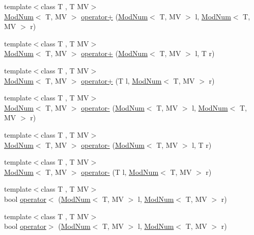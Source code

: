 \begin{DoxyCompactItemize}
\item 
{\footnotesize template$<$class T , T MV$>$ }\\\hyperlink{classModNum}{ModNum}$<$ T, MV $>$ \hyperlink{mod__num_8hh_af52718572c33bb045de69e9f52117615}{operator+} (\hyperlink{classModNum}{ModNum}$<$ T, MV $>$ l, \hyperlink{classModNum}{ModNum}$<$ T, MV $>$ r)
\item 
{\footnotesize template$<$class T , T MV$>$ }\\\hyperlink{classModNum}{ModNum}$<$ T, MV $>$ \hyperlink{mod__num_8hh_aaf99447ed554e609c6fc4dc36d138df0}{operator+} (\hyperlink{classModNum}{ModNum}$<$ T, MV $>$ l, T r)
\item 
{\footnotesize template$<$class T , T MV$>$ }\\\hyperlink{classModNum}{ModNum}$<$ T, MV $>$ \hyperlink{mod__num_8hh_af9edd9c0f5eb44a3e1e19c7a7dec606e}{operator+} (T l, \hyperlink{classModNum}{ModNum}$<$ T, MV $>$ r)
\item 
{\footnotesize template$<$class T , T MV$>$ }\\\hyperlink{classModNum}{ModNum}$<$ T, MV $>$ \hyperlink{mod__num_8hh_a0b84d236bd1e102c5583f610f6582935}{operator-\/} (\hyperlink{classModNum}{ModNum}$<$ T, MV $>$ l, \hyperlink{classModNum}{ModNum}$<$ T, MV $>$ r)
\item 
{\footnotesize template$<$class T , T MV$>$ }\\\hyperlink{classModNum}{ModNum}$<$ T, MV $>$ \hyperlink{mod__num_8hh_a94349bded8b1cad325abd3c73ad41b88}{operator-\/} (\hyperlink{classModNum}{ModNum}$<$ T, MV $>$ l, T r)
\item 
{\footnotesize template$<$class T , T MV$>$ }\\\hyperlink{classModNum}{ModNum}$<$ T, MV $>$ \hyperlink{mod__num_8hh_a0808f1add68bf995181f7924eb40906e}{operator-\/} (T l, \hyperlink{classModNum}{ModNum}$<$ T, MV $>$ r)
\item 
{\footnotesize template$<$class T , T MV$>$ }\\bool \hyperlink{mod__num_8hh_a84830aa30009cb5c8024c1de6f771316}{operator$<$} (\hyperlink{classModNum}{ModNum}$<$ T, MV $>$ l, \hyperlink{classModNum}{ModNum}$<$ T, MV $>$ r)
\item 
{\footnotesize template$<$class T , T MV$>$ }\\bool \hyperlink{mod__num_8hh_a5783f552d52471d44933cc6970fc5618}{operator$>$} (\hyperlink{classModNum}{ModNum}$<$ T, MV $>$ l, \hyperlink{classModNum}{ModNum}$<$ T, MV $>$ r)
\item 

\end{DoxyCompactItemize}
